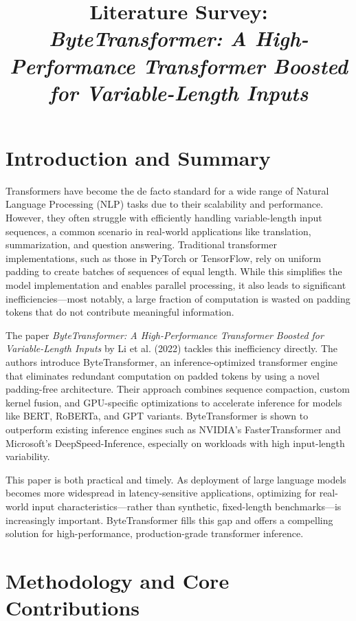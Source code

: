 \documentclass[11pt]{article}
\title{Literature Survey: \\ \textit{ByteTransformer: A High-Performance Transformer Boosted for Variable-Length Inputs}}
\author{}
\date{}
\begin{document}
\maketitle

\section{Introduction and Summary}

Transformers have become the de facto standard for a wide range of Natural Language Processing (NLP) tasks due to their scalability and performance. However, they often struggle with efficiently handling variable-length input sequences, a common scenario in real-world applications like translation, summarization, and question answering. Traditional transformer implementations, such as those in PyTorch or TensorFlow, rely on uniform padding to create batches of sequences of equal length. While this simplifies the model implementation and enables parallel processing, it also leads to significant inefficiencies—most notably, a large fraction of computation is wasted on padding tokens that do not contribute meaningful information.

The paper \textit{ByteTransformer: A High-Performance Transformer Boosted for Variable-Length Inputs} by Li et al. (2022) tackles this inefficiency directly. The authors introduce ByteTransformer, an inference-optimized transformer engine that eliminates redundant computation on padded tokens by using a novel padding-free architecture. Their approach combines sequence compaction, custom kernel fusion, and GPU-specific optimizations to accelerate inference for models like BERT, RoBERTa, and GPT variants. ByteTransformer is shown to outperform existing inference engines such as NVIDIA’s FasterTransformer and Microsoft’s DeepSpeed-Inference, especially on workloads with high input-length variability.

This paper is both practical and timely. As deployment of large language models becomes more widespread in latency-sensitive applications, optimizing for real-world input characteristics—rather than synthetic, fixed-length benchmarks—is increasingly important. ByteTransformer fills this gap and offers a compelling solution for high-performance, production-grade transformer inference.

\section{Methodology and Core Contributions}
\end{document}
